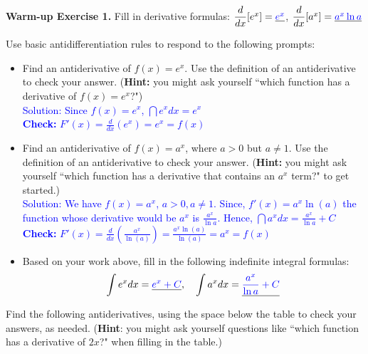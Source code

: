 \documentclass[10pt]{article}
\begin{document}
{\bf\color{blue} Warm-up Exercise 1.} Fill in derivative formulas:  
$\dfrac{d}{dx}[e^x] = \underline{\textcolor{blue}{e^x}}$, \quad
$\dfrac{d}{dx}[a^x] = \underline{\textcolor{blue}{a^x \ln a}}$

{} Use basic antidifferentiation rules to respond to the following prompts:
\begin{itemize}
\item[(a)] Find an antiderivative of $f(x)=e^x$. Use the definition of an antiderivative to check your answer. ({\bf Hint:} you might ask yourself ``which function has a derivative of $f(x)=e^x$?")
\\
\textcolor{blue}{Solution:
 Since $f(x)=e^x$, $\dint e^x dx = e^x$\\
 \textbf{Check:} $F'(x) = \frac{d}{dx}(e^x) = e^x = f(x)$
 }{}\item[(b)] Find an antiderivative of $f(x)=a^x$, where $a>0$ but $a\not=1$. Use the definition of an antiderivative to check your answer. ({\bf Hint:} you might ask yourself ``which function has a derivative that contains an $a^x$ term?" to get started.)
\\

\textcolor{blue}{Solution: We have $f(x)=a^x$, $a>0, a\neq 1$. Since, $f'(x) = a^x \ln(a)$ the function whose derivative would be $a^x$ is $\frac{a^x}{\ln a}$. Hence, $\dint a^x dx = \frac{a^x}{\ln a} + C$  \\
\textbf{Check:} $F'(x) = \frac{d}{dx}(\frac{a^x}{\ln(a)}) = \frac{a^x \ln(a)}{\ln(a)} = a^x = f(x)$
}
\item[(c)] Based on your work above, fill in the following indefinite integral formulas:\\
\[\displaystyle\int e^x dx = \underline{\textcolor{blue}{e^x + C}}, \quad \displaystyle\int a^x dx = \underline{\textcolor{blue}{\frac{a^x}{\ln a} + C}}\]
\end{itemize}

\newpage

\begin{center}
\end{center}
{} Find the following antiderivatives, using the space below the table to check your answers, as needed. ({\bf Hint}: you might ask yourself questions like ``which function has a derivative of $2x$?" when filling in the table.)
\renewcommand{\arraystretch}{2}
\end{document}
